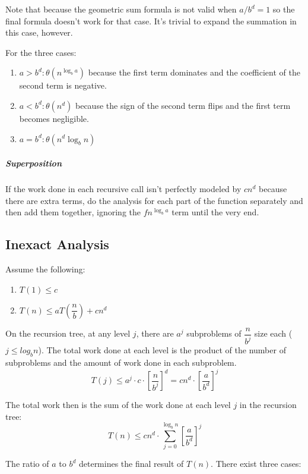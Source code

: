 \documentclass[11pt]{article}
\begin{document}
		Note that because the geometric sum formula is not valid when $a/b^d = 1$ so the final formula doesn't work for that case. It's trivial to expand the summation in this case, however.
		
		For the three cases:
		\begin{enumerate}
			\item $a > b^d: \theta(n^{\log_b a})$ because the first term dominates and the coefficient of the second term is negative.
			\item $a < b^d: \theta(n^d)$ because the sign of the second term flips and the first term becomes negligible.
			\item $a = b^d: \theta(n^d \log_b n)$
		\end{enumerate}
		
		\subparagraph{Superposition} If the work done in each recursive call isn't perfectly modeled by $cn^d$ because there are extra terms, do the analysis for each part of the function separately and then add them together, ignoring the $fn^{\log_b a}$ term until the very end.
	\subsection{Inexact Analysis}
		Assume the following:
		\begin{enumerate}
			\item $T(1)\leq c$
			\item $T(n)\leq aT\left(\dfrac{n}{b}\right) + cn^d$
		\end{enumerate}
		
		On the recursion tree, at any level $j$, there are $a^j$ subproblems of $\dfrac{n}{b^j}$ size each ($j\leq log_b n$). The total work done at each level is the product of the number of subproblems and the amount of work done in each subproblem.
		\begin{equation}
			T(j)\leq a^j\cdot c\cdot\left[\frac{n}{b^j}\right]^d = cn^d\cdot\left[\frac{a}{b^d}\right]^j
		\end{equation}
		
		The total work then is the sum of the work done at each level $j$ in the recursion tree:
		\begin{equation}
			T(n)\leq cn^d\cdot \sum_{j=0}^{\log_b n}\left[\frac{a}{b^d}\right]^j
		\end{equation}
		
		The ratio of $a$ to $b^d$ determines the final result of $T(n)$. There exist three cases:
		
\end{document}
